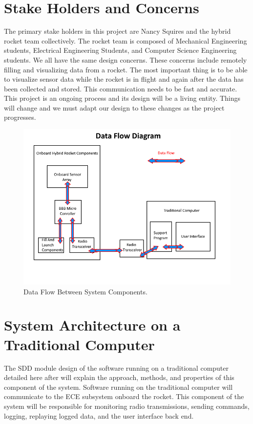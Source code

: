 \documentclass[10pt,draftclsnofoot,onecolumn,compsoc]{IEEEtran}
\begin{document}
\section{Stake Holders and Concerns}
The primary stake holders in this project are Nancy Squires and the hybrid rocket team collectively. The rocket team is composed of Mechanical Engineering students, Electrical Engineering Students, and Computer Science Engineering students. We all have the same design concerns. These concerns include remotely filling and visualizing data from a rocket. The most important thing is to be able to visualize sensor data while the rocket is in flight and again after the data has been collected and stored. This communication needs to be fast and accurate. This project is an ongoing process and its design will be a living entity. Things will change and we must adapt our design to these changes as the project progresses.

\begin{figure}[!ht]
  \caption{Data Flow Between System Components.}
  \centering
	\includegraphics[scale=.85]{RocketBlockDiagram}
\end{figure}
\FloatBarrier


\section{System Architecture on a Traditional Computer }
The SDD module design of the software running on a traditional computer detailed here after will explain the approach, methods, and properties of this component of the system. Software running on the traditional computer will communicate to the ECE subsystem onboard the rocket. This component of the system will be responsible for monitoring radio transmissions, sending commands, logging, replaying logged data, and the user interface back end. \par
\end{document}
